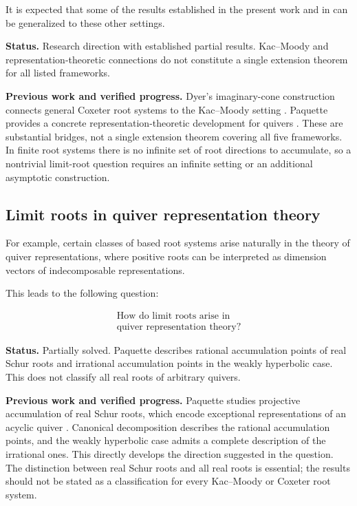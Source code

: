 \documentclass[11pt,reqno]{amsart}
\theoremstyle{plain}
\theoremstyle{definition}
\theoremstyle{remark}
\numberwithin{equation}{section}
\begin{document}
It is expected that some of the results established
in the present work and in \cite{HLR} can be generalized
to these other settings.


\par\medskip
\noindent\textbf{Status.} Research direction with established partial results. Kac--Moody and representation-theoretic connections do not constitute a single extension theorem for all listed frameworks.

\par\medskip
\noindent\textbf{Previous work and verified progress.}
Dyer's imaginary-cone construction connects general Coxeter root
systems to the Kac--Moody setting \cite{Dyer2019}. Paquette provides a
concrete representation-theoretic development for quivers
\cite{Paquette2016}. These are substantial bridges, not a single extension
theorem covering all five frameworks. In finite root systems there is
no infinite set of root directions to accumulate, so a nontrivial limit-root
question requires an infinite setting or an additional asymptotic construction.

\subsection{Limit roots in quiver representation theory}

For example, certain classes of based root systems
arise naturally in the theory of quiver representations,
where positive roots can be interpreted as dimension
vectors of indecomposable representations.

This leads to the following question:

\[
\boxed{
\begin{gathered}
\text{How do limit roots arise in}\\
\text{quiver representation theory?}
\end{gathered}
}
\]


\par\medskip
\noindent\textbf{Status.} Partially solved. Paquette describes rational accumulation points of real Schur roots and irrational accumulation points in the weakly hyperbolic case. This does not classify all real roots of arbitrary quivers.

\par\medskip
\noindent\textbf{Previous work and verified progress.}
Paquette studies projective accumulation of real Schur roots,
which encode exceptional representations of an acyclic quiver
\cite{Paquette2016}. Canonical decomposition describes the rational
accumulation points, and the weakly hyperbolic case admits a complete
description of the irrational ones. This directly develops the direction
suggested in the question. The distinction between real Schur roots and
all real roots is essential; the results should not be stated as a
classification for every Kac--Moody or Coxeter root system.



\end{document}
